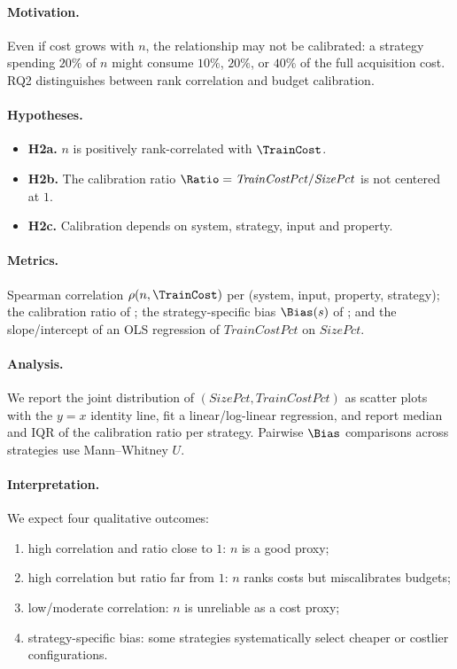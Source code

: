 \paragraph*{Motivation.}
Even if cost grows with $n$, the relationship may not be calibrated: a
strategy spending $20\%$ of $n$ might consume $10\%$, $20\%$, or $40\%$ of
the full acquisition cost. RQ2 distinguishes between rank correlation and
budget calibration.

\paragraph*{Hypotheses.}
\begin{itemize}
    \item \textbf{H2a.} $n$ is positively rank-correlated with $\TrainCost$.
    \item \textbf{H2b.} The calibration ratio
    $\Ratio = \mathit{TrainCostPct}/\mathit{SizePct}$ is not centered at $1$.
    \item \textbf{H2c.} Calibration depends on system, strategy, input and
    property.
\end{itemize}

\paragraph*{Metrics.}
Spearman correlation $\rho(n,\TrainCost)$ per (system, input, property,
strategy); the calibration ratio of ; the strategy-specific bias
$\Bias(s)$ of ; and the slope/intercept of an OLS regression of
$\mathit{TrainCostPct}$ on $\mathit{SizePct}$.

\paragraph*{Analysis.}
We report the joint distribution of $(\mathit{SizePct},\mathit{TrainCostPct})$
as scatter plots with the $y=x$ identity line, fit a linear/log-linear
regression, and report median and IQR of the calibration ratio per
strategy. Pairwise $\Bias$ comparisons across strategies use Mann--Whitney $U$.

\paragraph*{Interpretation.}
We expect four qualitative outcomes:
\begin{enumerate}
    \item high correlation and ratio close to $1$: $n$ is a good proxy;
    \item high correlation but ratio far from $1$: $n$ ranks costs but
    miscalibrates budgets;
    \item low/moderate correlation: $n$ is unreliable as a cost proxy;
    \item strategy-specific bias: some strategies systematically select cheaper
    or costlier configurations.
\end{enumerate}

